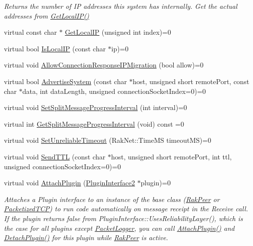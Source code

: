 \begin{DoxyCompactItemize}
\begin{DoxyCompactList}\small\item\em Returns the number of I\-P addresses this system has internally. Get the actual addresses from \hyperlink{class_rak_net_1_1_rak_peer_interface_ad070246537065910a500803bdf6b9cb2}{Get\-Local\-I\-P()} \end{DoxyCompactList}\item 
virtual const char $\ast$ \hyperlink{class_rak_net_1_1_rak_peer_interface_ad070246537065910a500803bdf6b9cb2}{Get\-Local\-I\-P} (unsigned int index)=0
\item 
virtual bool \hyperlink{class_rak_net_1_1_rak_peer_interface_ac37fe2c8b35abdc3a441541e539ebd10}{Is\-Local\-I\-P} (const char $\ast$ip)=0
\item 
virtual void \hyperlink{class_rak_net_1_1_rak_peer_interface_aa4a2525f004aaf073e1b25b0ffe0c0d2}{Allow\-Connection\-Response\-I\-P\-Migration} (bool allow)=0
\item 
virtual bool \hyperlink{class_rak_net_1_1_rak_peer_interface_adccf6f091e1ac19ad92099d50fe649d7}{Advertise\-System} (const char $\ast$host, unsigned short remote\-Port, const char $\ast$data, int data\-Length, unsigned connection\-Socket\-Index=0)=0
\item 
virtual void \hyperlink{class_rak_net_1_1_rak_peer_interface_a4112544503b05a7b7dd2dd56adfbc648}{Set\-Split\-Message\-Progress\-Interval} (int interval)=0
\item 
virtual int \hyperlink{class_rak_net_1_1_rak_peer_interface_abd4be92bcad53af859e502127c060247}{Get\-Split\-Message\-Progress\-Interval} (void) const =0
\item 
virtual void \hyperlink{class_rak_net_1_1_rak_peer_interface_a87db4b6410fce078080400f8d58328ed}{Set\-Unreliable\-Timeout} (Rak\-Net\-::\-Time\-M\-S timeout\-M\-S)=0
\item 
virtual void \hyperlink{class_rak_net_1_1_rak_peer_interface_a700a2c9bc1414da194a35076af3b56e0}{Send\-T\-T\-L} (const char $\ast$host, unsigned short remote\-Port, int ttl, unsigned connection\-Socket\-Index=0)=0
\item 
virtual void \hyperlink{class_rak_net_1_1_rak_peer_interface_a2cfd224842b6f1d5e2881901c9f71531}{Attach\-Plugin} (\hyperlink{class_rak_net_1_1_plugin_interface2}{Plugin\-Interface2} $\ast$plugin)=0
\begin{DoxyCompactList}\small\item\em Attaches a Plugin interface to an instance of the base class (\hyperlink{class_rak_net_1_1_rak_peer}{Rak\-Peer} or \hyperlink{class_rak_net_1_1_packetized_t_c_p}{Packetized\-T\-C\-P}) to run code automatically on message receipt in the Receive call. If the plugin returns false from Plugin\-Interface\-::\-Uses\-Reliability\-Layer(), which is the case for all plugins except \hyperlink{class_rak_net_1_1_packet_logger}{Packet\-Logger}, you can call \hyperlink{class_rak_net_1_1_rak_peer_interface_a2cfd224842b6f1d5e2881901c9f71531}{Attach\-Plugin()} and \hyperlink{class_rak_net_1_1_rak_peer_interface_a4960f6a8d37d70e7e98f1f6fe54e323d}{Detach\-Plugin()} for this plugin while \hyperlink{class_rak_net_1_1_rak_peer}{Rak\-Peer} is active. \end{DoxyCompactList}\item 

\end{DoxyCompactItemize}
